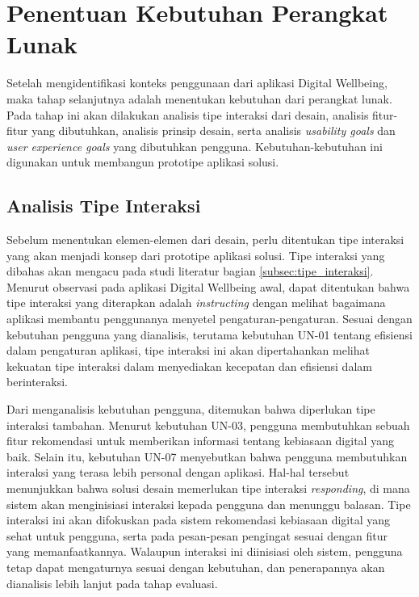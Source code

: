 \section{Penentuan Kebutuhan Perangkat Lunak}

Setelah mengidentifikasi konteks penggunaan dari aplikasi Digital Wellbeing, maka tahap selanjutnya adalah menentukan kebutuhan dari perangkat lunak. Pada tahap ini akan dilakukan analisis tipe interaksi dari desain, analisis fitur-fitur yang dibutuhkan, analisis prinsip desain, serta analisis \textit{usability goals} dan \textit{user experience goals} yang dibutuhkan pengguna. Kebutuhan-kebutuhan ini digunakan untuk membangun prototipe aplikasi solusi.

\subsection{Analisis Tipe Interaksi}

Sebelum menentukan elemen-elemen dari desain, perlu ditentukan tipe interaksi yang akan menjadi konsep dari prototipe aplikasi solusi. Tipe interaksi yang dibahas akan mengacu pada studi literatur bagian \ref{subsec:tipe_interaksi}. Menurut observasi pada aplikasi Digital Wellbeing awal, dapat ditentukan bahwa tipe interaksi yang diterapkan adalah \textit{instructing} dengan melihat bagaimana aplikasi membantu penggunanya menyetel pengaturan-pengaturan. Sesuai dengan kebutuhan pengguna yang dianalisis, terutama kebutuhan UN-01 tentang efisiensi dalam pengaturan aplikasi, tipe interaksi ini akan dipertahankan melihat kekuatan tipe interaksi dalam menyediakan kecepatan dan efisiensi dalam berinteraksi.

Dari menganalisis kebutuhan pengguna, ditemukan bahwa diperlukan tipe interaksi tambahan. Menurut kebutuhan UN-03, pengguna membutuhkan sebuah fitur rekomendasi untuk memberikan informasi tentang kebiasaan digital yang baik. Selain itu, kebutuhan UN-07 menyebutkan bahwa pengguna membutuhkan interaksi yang terasa lebih personal dengan aplikasi. Hal-hal tersebut menunjukkan bahwa solusi desain memerlukan tipe interaksi \textit{responding}, di mana sistem akan menginisiasi interaksi kepada pengguna dan menunggu balasan. Tipe interaksi ini akan difokuskan pada sistem rekomendasi kebiasaan digital yang sehat untuk pengguna, serta pada pesan-pesan pengingat sesuai dengan fitur yang memanfaatkannya. Walaupun interaksi ini diinisiasi oleh sistem, pengguna tetap dapat mengaturnya sesuai dengan kebutuhan, dan penerapannya akan dianalisis lebih lanjut pada tahap evaluasi.

